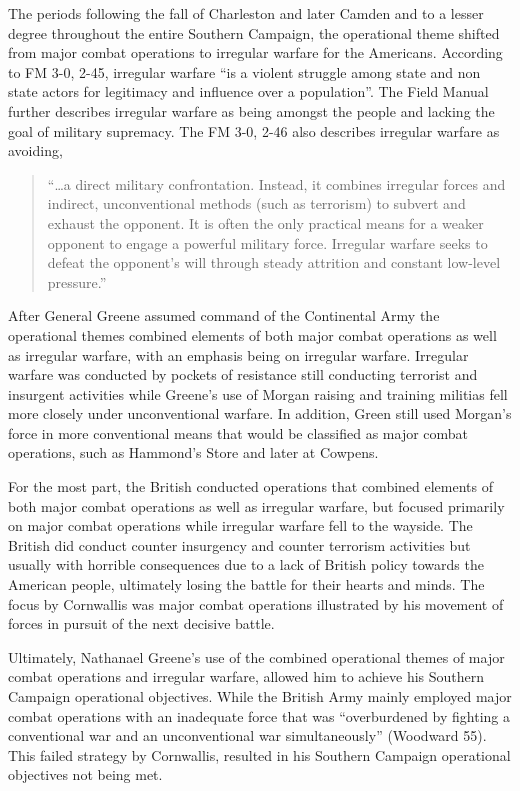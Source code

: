 The periods following the fall of Charleston and later Camden and to a lesser degree throughout the entire Southern Campaign, the operational theme shifted from major combat operations to irregular warfare for the Americans.  According to FM 3-0, 2-45, irregular warfare ``is a violent struggle among state and non state actors for legitimacy and influence over a population''.  The Field Manual further describes irregular warfare as being amongst the people and lacking the goal of military supremacy.  The FM 3-0, 2-46 also describes irregular warfare as avoiding,

\begin{quote}
 ``\ldots a direct military confrontation. Instead, it combines irregular forces and indirect, unconventional methods (such as terrorism) to subvert and exhaust the opponent. It is often the only practical means for a weaker opponent to engage a powerful military force. Irregular warfare seeks to defeat the opponent's will through steady attrition and constant low-level pressure.''
\end{quote}

After General Greene assumed command of the Continental Army the operational themes combined elements of both major combat operations as well as irregular warfare, with an emphasis being on irregular warfare.  Irregular warfare was conducted by pockets of resistance still conducting terrorist and insurgent activities while Greene's use of Morgan raising and training militias fell more closely under unconventional warfare.  In addition, Green still used Morgan's force in more conventional means that would be classified as major combat operations, such as Hammond's Store and later at Cowpens.

For the most part, the British conducted operations that combined elements of both major combat operations as well as irregular warfare, but focused primarily on major combat operations while irregular warfare fell to the wayside.  The British did conduct counter insurgency and counter terrorism activities but usually with horrible consequences due to a lack of British policy towards the American people, ultimately losing the battle for their hearts and minds.  The focus by Cornwallis was major combat operations illustrated by his movement of forces in pursuit of the next decisive battle.  

Ultimately, Nathanael Greene's use of the combined operational themes of major combat operations and irregular warfare, allowed him to achieve his Southern Campaign operational objectives.  While the British Army mainly employed major combat operations with an inadequate force that was ``overburdened by fighting a conventional war and an unconventional war simultaneously'' (Woodward 55).  This failed strategy by Cornwallis, resulted in his Southern Campaign operational objectives not being met.


